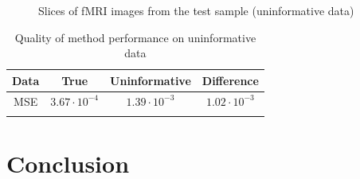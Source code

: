 \documentclass[sn-mathphys-num]{sn-jnl}%
\theoremstyle{thmstyleone}%
\theoremstyle{thmstyletwo}%
\theoremstyle{thmstylethree}%
\begin{document}
\begin{figure}[h!]
	\centering
	\hfill
	\hfill
	\caption{Slices of fMRI images from the test sample (uninformative data)}
	\label{fig:random}
\end{figure}

\begin{table}[h!]
\caption{Quality of method performance on uninformative data}\label{table:random}
\begin{tabular}{@{}cccc@{}}
\toprule
Data & True & Uninformative & Difference \\
\midrule
MSE     & $3.67 \cdot 10^{-4}$ & $1.39 \cdot 10^{-3}$ & $1.02 \cdot 10^{-3}$ \\
\botrule
\end{tabular}
\end{table}

\section{Conclusion}
\end{document}
